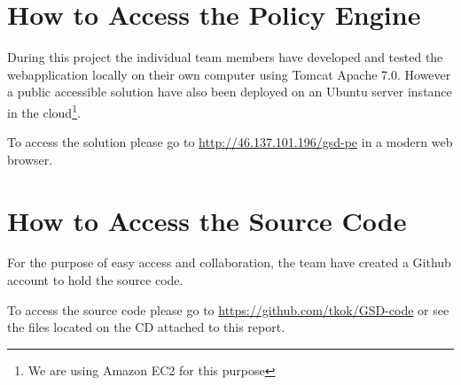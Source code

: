 \section{How to Access the Policy Engine} \label{sec:howto-policy-engine}
During this project the individual team members have developed and tested the webapplication locally on their own computer using Tomcat Apache 7.0. However a public accessible solution have also been deployed on an Ubuntu server instance in the cloud\footnote{We are using Amazon EC2 for this purpose}.

To access the solution please go to \url{http://46.137.101.196/gsd-pe} in a modern web browser.

\section{How to Access the Source Code} \label{sec:howto-access-code}
For the purpose of easy access and collaboration, the team have created a Github account to hold the source code.

To access the source code please go to \url{https://github.com/tkok/GSD-code} or see the files located on the CD attached to this report.